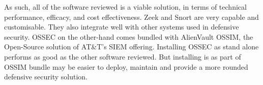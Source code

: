 As such, all of the software reviewed is a viable solution, in terms of technical performance, efficacy, and cost effectiveness. Zeek and Snort are very capable and customisable. They also integrate well with other systems used in defensive security. OSSEC on the other-hand comes bundled with AlienVault OSSIM, the Open-Source solution of AT\&T's SIEM offering. Installing OSSEC as stand alone performs as good as the other software reviewed. But installing is as part of OSSIM bundle may be easier to deploy, maintain and provide a more rounded defensive security solution.

